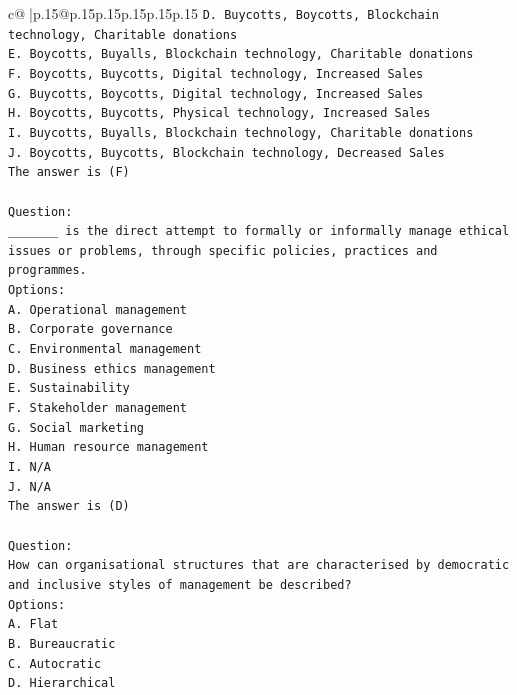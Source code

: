 \documentclass{article}
\begin{document}
{\begin{supertabular}{c@{$\;$}|p{.15\linewidth}@{}p{.15\linewidth}p{.15\linewidth}p{.15\linewidth}p{.15\linewidth}p{.15\linewidth}}
{{{\texttt{D. Buycotts, Boycotts, Blockchain technology, Charitable donations} \\
\texttt{E. Boycotts, Buyalls, Blockchain technology, Charitable donations} \\
\texttt{F. Boycotts, Buycotts, Digital technology, Increased Sales} \\
\texttt{G. Buycotts, Boycotts, Digital technology, Increased Sales} \\
\texttt{H. Boycotts, Buycotts, Physical technology, Increased Sales} \\
\texttt{I. Buycotts, Buyalls, Blockchain technology, Charitable donations} \\
\texttt{J. Boycotts, Buycotts, Blockchain technology, Decreased Sales} \\
\texttt{The answer is (F)} \\
\\ 
\texttt{Question:} \\
\texttt{\_\_\_\_\_\_\_ is the direct attempt to formally or informally manage ethical issues or problems, through specific policies, practices and programmes.} \\
\texttt{Options:} \\
\texttt{A. Operational management} \\
\texttt{B. Corporate governance} \\
\texttt{C. Environmental management} \\
\texttt{D. Business ethics management} \\
\texttt{E. Sustainability} \\
\texttt{F. Stakeholder management} \\
\texttt{G. Social marketing} \\
\texttt{H. Human resource management} \\
\texttt{I. N/A} \\
\texttt{J. N/A} \\
\texttt{The answer is (D)} \\
\\ 
\texttt{Question:} \\
\texttt{How can organisational structures that are characterised by democratic and inclusive styles of management be described?} \\
\texttt{Options:} \\
\texttt{A. Flat} \\
\texttt{B. Bureaucratic} \\
\texttt{C. Autocratic} \\
\texttt{D. Hierarchical} \\
}}}
\end{supertabular}}
\end{document}
